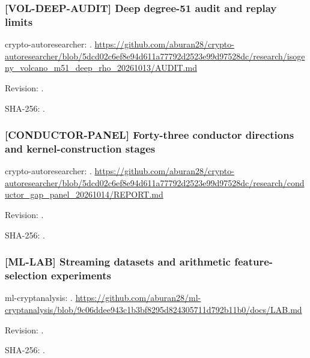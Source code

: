 \par\noindent\begin{minipage}{\linewidth}\small
\subsubsection*{[VOL-DEEP-AUDIT] Deep degree-51 audit and replay limits}\label{art:VOL-DEEP-AUDIT}
crypto-autoresearcher: .
\url{https://github.com/aburan28/crypto-autoresearcher/blob/5dcd02c6ef8e94d611a77792d2523e99d97528dc/research/isogeny_volcano_m51_deep_rho_20261013/AUDIT.md}
\par Revision: .
\par SHA-256: .
\end{minipage}\par\medskip

\par\noindent\begin{minipage}{\linewidth}\small
\subsubsection*{[CONDUCTOR-PANEL] Forty-three conductor directions and kernel-construction stages}\label{art:CONDUCTOR-PANEL}
crypto-autoresearcher: .
\url{https://github.com/aburan28/crypto-autoresearcher/blob/5dcd02c6ef8e94d611a77792d2523e99d97528dc/research/conductor_gap_panel_20261014/REPORT.md}
\par Revision: .
\par SHA-256: .
\end{minipage}\par\medskip

\par\noindent\begin{minipage}{\linewidth}\small
\subsubsection*{[ML-LAB] Streaming datasets and arithmetic feature-selection experiments}\label{art:ML-LAB}
ml-cryptanalysis: .
\url{https://github.com/aburan28/ml-cryptanalysis/blob/9c06ddee943c1b3bf8295d824305711d792b11b0/docs/LAB.md}
\par Revision: .
\par SHA-256: .
\end{minipage}\par\medskip

